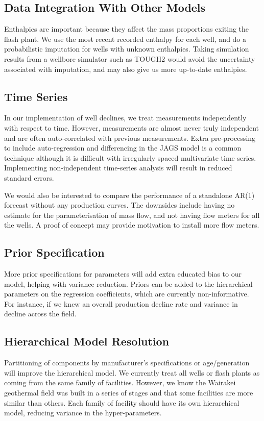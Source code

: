 \documentclass[a4paper, 12pt]{article}
\begin{document}
\subsection{Data Integration With Other Models}
Enthalpies are important because they affect the mass proportions exiting the flash plant. We use the most recent recorded enthalpy for each well, and do a probabilistic imputation for wells with unknown enthalpies. Taking simulation results from a wellbore simulator such as TOUGH2 would avoid the uncertainty associated with imputation, and may also give us more up-to-date enthalpies.

\subsection{Time Series}
In our implementation of well declines, we treat measurements independently with respect to time. However, measurements are almost never truly independent and are often auto-correlated with previous measurements. Extra pre-processing to include auto-regression and differencing in the JAGS model is a common technique although it is difficult with irregularly spaced multivariate time series. Implementing non-independent time-series analysis will result in reduced standard errors.

We would also be interested to compare the performance of a standalone AR(1) forecast without any production curves. The downsides include having no estimate for the parameterisation of mass flow, and not having flow meters for all the wells. A proof of concept may provide motivation to install more flow meters.

\subsection{Prior Specification}
More prior specifications for parameters will add extra educated bias to our model, helping with variance reduction. Priors can be added to the hierarchical parameters on the regression coefficients, which are currently non-informative. For instance, if we knew an overall production decline rate and variance in decline across the field.

\subsection{Hierarchical Model Resolution}
Partitioning of components by manufacturer's specifications or age/generation will improve the hierarchical model. We currently treat all wells or flash plants as coming from the same family of facilities. However, we know the Wairakei geothermal field was built in a series of stages and that some facilities are more similar than others. Each family of facility should have its own hierarchical model, reducing variance in the hyper-parameters.
\end{document}
